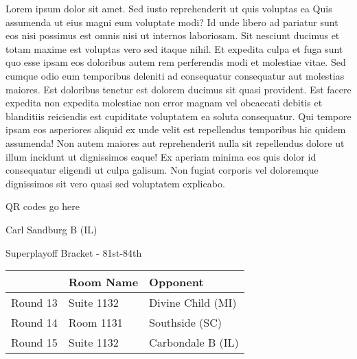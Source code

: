 \documentclass{article}%
\begin{document}
\vspace*{8pt}%
\linebreak%
\newline%
\newline%
Lorem ipsum dolor sit amet. Sed iusto reprehenderit ut quis voluptas ea Quis assumenda ut eius magni eum voluptate modi? Id unde libero ad pariatur sunt eos nisi possimus est omnis nisi ut internos laboriosam. Sit nesciunt ducimus et totam maxime est voluptas vero sed itaque nihil. Et expedita culpa et fuga sunt quo esse ipsam eos doloribus autem rem perferendis modi et molestiae vitae.\newline%
\newline%
Sed cumque odio eum temporibus deleniti ad consequatur consequatur aut molestias maiores. Est doloribus tenetur est dolorem ducimus sit quasi provident. Est facere expedita non expedita molestiae non error magnam vel obcaecati debitis et blanditiis reiciendis est cupiditate voluptatem ea soluta consequatur. Qui tempore ipsam eos asperiores aliquid ex unde velit est repellendus temporibus hic quidem assumenda!\newline%
\newline%
Non autem maiores aut reprehenderit nulla sit repellendus dolore ut illum incidunt ut dignissimos eaque! Ex aperiam minima eos quis dolor id consequatur eligendi ut culpa galisum. Non fugiat corporis vel doloremque dignissimos sit vero quasi sed voluptatem explicabo.\newline%
\newline%
%
\vspace*{30pt}%
\begin{center}%
\begin{Huge}%
QR codes go here%
\end{Huge}%
\end{center}%
\newpage%
\begin{center}%
\begin{Huge}%
Carl Sandburg B (IL)%
\end{Huge}%
\vspace*{8pt}%
\linebreak%
\begin{Large}%
Superplayoff Bracket {-} 81st{-}84th%
\end{Large}%
\end{center}%
%
\begin{tabularx}{\textwidth}{|c|Y|Y|}%
\hline%
&Room Name&Opponent\\%
\hline%
Round 13&Suite 1132&Divine Child (MI)\\%
Round 14&Room 1131&Southside (SC)\\%
Round 15&Suite 1132&Carbondale B (IL)\\%
\hline%
\end{tabularx}%
\end{document}
